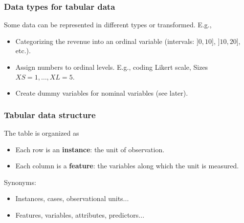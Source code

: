 \begin{frame}
\frametitle{Data types for tabular data}
Some data can be represented in different types or transformed. E.g., 
\begin{itemize}
\item Categorizing the revenue into an ordinal variable (intervals: $]0,10]$, $]10,20]$, etc.).
\item Assign numbers to ordinal levels. E.g., coding Likert scale, Sizes $XS=1, \ldots, XL=5$.
\item Create dummy variables for nominal variables (see later).
\end{itemize}
\end{frame}
\begin{frame}
\frametitle{Tabular data structure}
The table is organized as 
\begin{itemize}
\item Each row is an {\bf instance}: the unit of observation. 
\item Each column is a {\bf feature}: the variables along which the unit is measured.
\end{itemize}
Synonyms:
\begin{itemize}
\item Instances, cases, observational units... 
\item Features, variables, attributes, predictors...
\end{itemize}
\end{frame}
